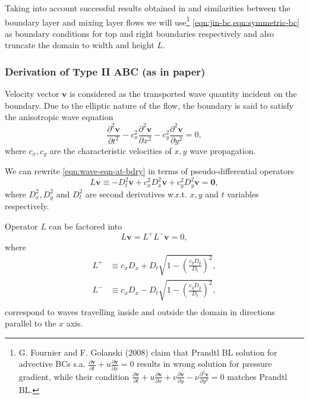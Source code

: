 \documentclass{article}
\begin{document}
Taking into account successful results obtained in \cite{Kourta:1987, Jin:1993, Persillon:1998} and similarities between the boundary layer and mixing layer flows we will use\footnote{G. Fournier and F. Golanski (2008) claim that Prandtl BL solution for advective BCs s.a. $\frac{\partial \boldsymbol{v}}{\partial t} + u\frac{\partial \boldsymbol{v}}{\partial x}=0$ results in wrong solution for pressure gradient, while their condition $\frac{\partial \boldsymbol{v}}{\partial t}+u \frac{\partial \boldsymbol{v}}{\partial x}+v \frac{\partial \boldsymbol{v}}{\partial y}-\nu \frac{\partial^2 \boldsymbol{v}}{\partial y^2}=0$ matches Prandtl BL.} \cref{eqn:jin-bc,eqn:symmetric-bc} as boundary conditions for top and right boundaries respectively and also truncate the domain to width and height $L$.

\subsubsection{Derivation of Type II ABC (as in paper)}\label{subsubsec:non-reflecting-abc}
Velocity vector $\boldsymbol{v}$ is considered as the transported wave quantity incident on the boundary. 
Due to the elliptic nature of the flow, the boundary is said to satisfy the anisotropic wave equation
\begin{equation}\label{eqn:wave-eqn-at-bdry}
	\frac{\partial ^2 \boldsymbol{v}}{\partial t^2}-c_x^2\frac{\partial ^2 \boldsymbol{v}}{\partial x^2}-c_y^2\frac{\partial ^2 \boldsymbol{v}}{\partial y^2}=0,
\end{equation}
where $c_x,c_y$ are the characteristic velocities of $x,y$ wave propagation. 

We can rewrite \cref{eqn:wave-eqn-at-bdry} in terms of pseudo-differential operators
\begin{equation*}
	L\boldsymbol{v}\equiv -D_t^2\boldsymbol{v}+c_x^2D_x^2\boldsymbol{v}+c_y^2D_y^2\boldsymbol{v=0},
\end{equation*}
where $D^2_x,D^2_y$ and $D^2_t$ are second derivatives w.r.t. $x,y$ and $t$ variables respectively. 

Operator $L$ can be factored into
\begin{equation*}
	L\boldsymbol{v}=L^+L^-\boldsymbol{v}=0,
\end{equation*}
where
\begin{align*}
	L^+&\equiv c_x D_x + D_t\sqrt{1-\left( \frac{c_y D_y}{D_t}\right)^2},\\
	L^-&\equiv c_x D_x - D_t\sqrt{1-\left( \frac{c_y D_y}{D_t}\right)^2},\\
\end{align*}
correspond to waves travelling inside and outside the domain in directions parallel to the $x$ axis. 
\end{document}

